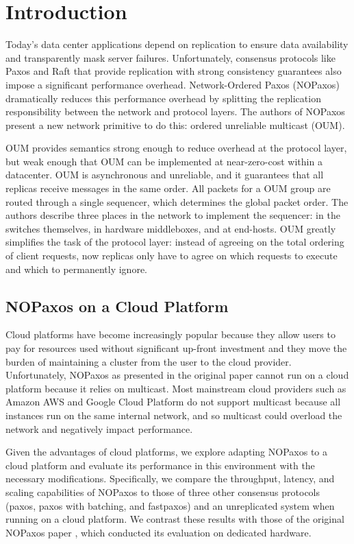 \section{Introduction}

\indent Today's data center applications depend on replication to ensure data availability and transparently mask server failures. Unfortunately, consensus protocols like Paxos\cite{paxos,paxossimple} and Raft\cite{raft} that provide replication with strong consistency guarantees also impose a significant performance overhead. Network-Ordered Paxos\cite{nopaxos} (NOPaxos) dramatically reduces this performance overhead by splitting the replication responsibility between the network and protocol layers. The authors of NOPaxos present a new network primitive to do this: ordered unreliable multicast (OUM). 

OUM provides semantics strong enough to reduce overhead at the protocol layer, but weak enough that OUM can be implemented at near-zero-cost within a datacenter. OUM is asynchronous and unreliable, and it guarantees that all replicas receive messages in the same order. All packets for a OUM group are routed through a single sequencer, which determines the global packet order. The authors describe three places in the network to implement the sequencer: in the switches themselves, in hardware middleboxes, and at end-hosts. OUM greatly simplifies the task of the protocol layer: instead of agreeing on the total ordering of client requests, now replicas only have to agree on which requests to execute and which to permanently ignore. 

\subsection{NOPaxos on a Cloud Platform}
    
Cloud platforms have become increasingly popular because they allow users to pay for resources used without significant up-front investment and they move the burden of maintaining a cluster from the user to the cloud provider. Unfortunately, NOPaxos as presented in the original paper \cite{nopaxos} cannot run on a cloud platform because it relies on multicast. Most mainstream cloud providers such as Amazon AWS and Google Cloud Platform do not support multicast because all instances run on the same internal network, and so multicast could overload the network and negatively impact performance. 

Given the advantages of cloud platforms, we explore adapting NOPaxos to a cloud platform and evaluate its performance in this environment with the necessary modifications. Specifically, we compare the throughput, latency, and scaling capabilities of NOPaxos to those of three other consensus protocols (paxos, paxos with batching, and fastpaxos) and an unreplicated system when running on a cloud platform. We contrast these results with those of the original NOPaxos paper \cite{nopaxos}, which conducted its evaluation on dedicated hardware.

